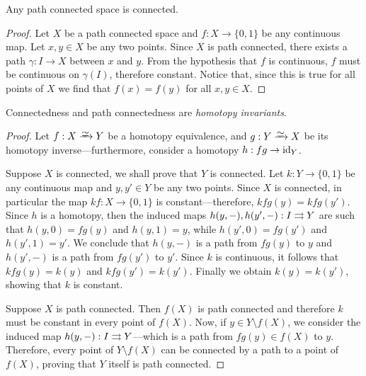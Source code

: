 \begin{proposition}
\label{prop:path-connected-is-connected}
Any path connected space is connected.
\end{proposition}

\begin{proof}
Let \(X\) be a path connected space and \(f: X \to \{0, 1\}\) be any continuous
map. Let \(x, y \in X\) be any two points. Since \(X\) is path connected, there
exists a path \(\gamma: I \to X\) between \(x\) and \(y\). From the hypothesis
that \(f\) is continuous, \(f\) must be continuous on \(\gamma(I)\), therefore
constant. Notice that, since this is true for all points of \(X\) we find that
\(f(x) = f(y)\) for all \(x, y \in X\).
\end{proof}

\begin{proposition}
\label{prop:path-conn-htpy-invariant}
Connectedness and path connectedness are \emph{homotopy invariants}.
\end{proposition}

\begin{proof}
Let \(f: X \isoto Y\) be a homotopy equivalence, and \(g: Y \isoto X\) be its
homotopy inverse---furthermore, consider a homotopy \(h: fg \to \operatorname{id}_Y\).

Suppose \(X\) is connected, we shall prove that \(Y\) is connected. Let
\(k: Y \to \{0, 1\}\) be any continuous map and \(y, y' \in Y\) be any two
points. Since \(X\) is connected, in particular the map \(k f: X \to \{0, 1\}\)
is constant---therefore, \(k f g(y) = k f g(y')\). Since \(h\) is a homotopy,
then the induced maps \(h(y, -), h(y', -): I \rightrightarrows Y\) are such that
\(h(y, 0) = f g(y)\) and \(h(y, 1) = y\), while \(h(y', 0) = f g(y')\) and
\(h(y', 1) = y'\). We conclude that \(h(y, -)\) is a path from \(fg(y)\) to
\(y\) and \(h(y', -)\) is a path from \(fg(y')\) to \(y'\). Since \(k\) is
continuous, it follows that \(k f g(y) = k(y)\) and \(kfg(y') = k(y')\). Finally
we obtain \(k(y) = k(y')\), showing that \(k\) is constant.

Suppose \(X\) is path connected. Then \(f(X)\) is path connected and therefore
\(k\) must be constant in every point of \(f(X)\). Now, if
\(y \in Y \setminus f(X)\), we consider the induced map
\(h(y, -): I \rightrightarrows Y\)---which is a path from \(fg(y) \in f(X)\) to
\(y\). Therefore, every point of \(Y \setminus f(X)\) can be connected by a path
to a point of \(f(X)\), proving that \(Y\) itself is path connected.
\end{proof}

